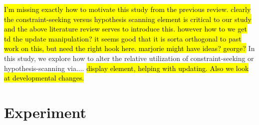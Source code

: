 \documentclass[10pt,letterpaper]{article}
\begin{document}

%

\hl{I'm missing exactly how to motivate this study from the previous review.
clearly the constraint-seeking versus hypothesis scanning element is critical
to our study and the above literature review serves to introduce this. however
how to we get td the update manipulation?  it seems good that it is sorta
orthogonal to past work on this, but need the right hook here.  marjorie
might have ideas?  george?}
In this study, we explore how to alter the relative utilization of constraint-seeking
or hypothesis-scanning via.... \hl{display element, helping with updating.  Also
we look at developmental changes.}

\section{Experiment}

\end{document}
